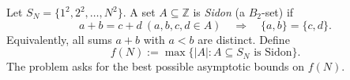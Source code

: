 Let \(S_N=\{1^2,2^2,\dots,N^2\}\).
A set \(A\subseteq\mathbb{Z}\) is \emph{Sidon} (a \(B_2\)-set) if
\[
a+b=c+d\ (a,b,c,d\in A)\quad\Longrightarrow\quad \{a,b\}=\{c,d\}.
\]
Equivalently, all sums \(a+b\) with \(a<b\) are distinct.
Define
\[
f(N):=\max\{|A|:A\subseteq S_N \text{ is Sidon}\}.
\]
The problem asks for the best possible asymptotic bounds on \(f(N)\).
